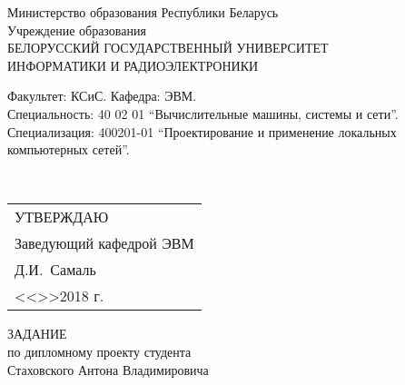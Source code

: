 {
    \setlength{\parindent}{0em}

    \newcommand{\lineunderscore}{\uline{\hspace*{\fill}}}
    \newcommand\tab[1][1cm]{\hspace*{#1}}

    \begin{center}
        Министерство образования Республики Беларусь\\[1em]
        Учреждение образования\\
        БЕЛОРУССКИЙ ГОСУДАРСТВЕННЫЙ УНИВЕРСИТЕТ \\
        ИНФОРМАТИКИ И РАДИОЭЛЕКТРОНИКИ\\[1em]
    \end{center}

    \begin{minipage}{\textwidth}
        \begin{flushleft}
            Факультет: КСиС. Кафедра: ЭВМ. \\
            Специальность: 40 02 01 ``Вычислительные машины, системы и сети''.
            Специализация: 400201-01 ``Проектирование и применение локальных компьютерных сетей''.
        \end{flushleft}
    \end{minipage}\\[1em]

    \begin{minipage}{\textwidth}
        \begin{flushright}
            \begin{tabular}{p{}}
                УТВЕРЖДАЮ \\
                Заведующий кафедрой ЭВМ \\
                \underline{\hspace*{5em}}Д.И.~Самаль \\
                <<\underline{\hspace*{4ex}}>>\underline{\hspace*{6em}}2018 г.
            \end{tabular}
        \end{flushright}
    \end{minipage}

    \begin{center}
        ЗАДАНИЕ \\
        по дипломному проекту студента \\
        Стаховского Антона Владимировича
    \end{center}

}
